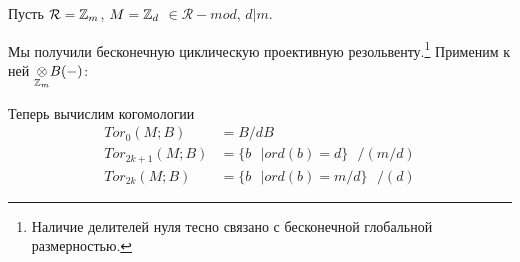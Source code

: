 \documentclass[../main.tex]{subfiles}
\begin{document}
\begin{to_ex}
Пусть $\mathcal{R} = \mathbb{Z}_m$, $M = \mathbb{Z}_d$ $\in\mathcal{R}-mod$, $d|m$. 
\bee
{}
\eee
Мы получили бесконечную циклическую проективную резольвенту.\footnote{Наличие делителей нуля тесно связано с бесконечной глобальной размерностью.} Применим к ней $\underset{\mathbb{Z}_m}{\otimes}B (-)$:
\bee
{}
\eee
Теперь вычислим когомологии
\begin{align*}
    Tor_0(M; B) &= B / dB\\
    Tor_{2k+1}(M; B) &=  \lbrace b \text{ }| ord(b)=d \rbrace \text{ }/ (m/d)  \\
    Tor_{2k}(M; B) &=  \lbrace b \text{ }| ord(b)= m/d \rbrace \text{ }/ (d)
\end{align*}
\end{to_ex}
\end{document}
